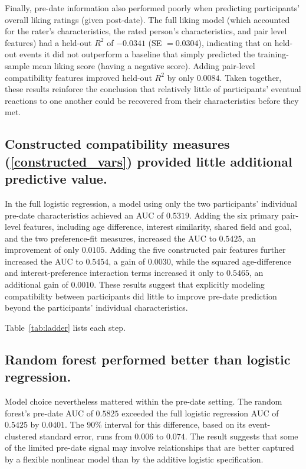 \documentclass[11pt,letterpaper,reqno]{amsart}
\numberwithin{equation}{subsection}
\theoremstyle{definition}
\numberwithin{thm}{subsection}
\begin{document}


Finally, pre-date information also performed poorly when predicting participants' overall liking ratings (given post-date). The full liking model (which accounted for the rater's characteristics, the rated person's characteristics, and pair level features) had a held-out \(R^2\) of \(-0.0341\) (SE \(=0.0304\)), indicating that on held-out events it did not outperform a baseline that simply predicted the training-sample mean liking score (having a negative score). Adding pair-level compatibility features improved held-out \(R^2\) by only \(0.0084\). Taken together, these results reinforce the conclusion that relatively little of participants' eventual reactions to one another could be recovered from their characteristics before they met.

\subsection{Constructed compatibility measures (\ref{constructed_vars}) provided  little additional predictive value.}
In the full logistic regression, a model using only the two participants' individual pre-date characteristics achieved an AUC of \(0.5319\). Adding the six primary pair-level features, including age difference, interest similarity, shared field and goal, and the two preference-fit measures, increased the AUC to \(0.5425\), an improvement of only \(0.0105\). Adding the five constructed pair features further increased the AUC to \(0.5454\), a gain of \(0.0030\), while the squared age-difference and interest-preference interaction terms increased it only to \(0.5465\), an additional gain of \(0.0010\). These results suggest that explicitly modeling compatibility between participants did little to improve pre-date prediction beyond the participants' individual characteristics.

Table~\ref{tab:ladder} lists each step.



\subsection{Random forest performed better than logistic regression.}
Model choice nevertheless mattered within the pre-date setting. The random forest's pre-date AUC of \(0.5825\) exceeded the full logistic regression AUC of \(0.5425\) by \(0.0401\). The 90\% interval for this difference, based on its event-clustered standard error, runs from \(0.006\) to \(0.074\). The result suggests that some of the limited pre-date signal may involve relationships that are better captured by a flexible nonlinear model than by the additive logistic specification.
\end{document}
